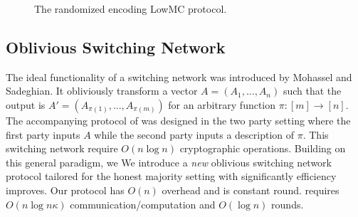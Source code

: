\begin{figure}
\vspace{-0.2cm}
	\caption{The randomized encoding LowMC protocol.}
	\label{fig:randomized-encode-lowMC}	
	\vspace{-0.4cm}
\end{figure}



\subsection{Oblivious Switching Network}

The ideal functionality of a switching network was introduced by Mohassel and Sadeghian\cite{MS13}. It obliviously transform a vector $A=(A_1,...,A_n)$ such that the output is $A'=(A_{\pi(1)}, ..., A_{\pi(m)})$ for an arbitrary function $\pi : [m]\rightarrow[n]$. The accompanying protocol of \cite{MS13} was designed in the two party setting where the first party inputs $A$ while the second party inputs a description of $\pi$. \iffullversion
This switching network require  $O(n\log n)$ cryptographic operations. Building on this general paradigm, we 
\else 
We
\fi
introduce a \emph{new} oblivious switching network protocol tailored for the honest majority setting with significantly efficiency improves. Our protocol has $O(n)$ overhead and is constant round. \cite{MS13} requires $O(n\log n \kappa)$ communication/computation and $O(\log n)$ rounds. %

